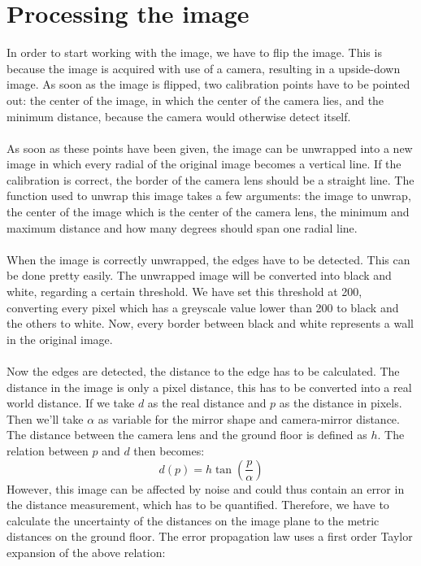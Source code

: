 \documentclass[12pt]{article}
\begin{document}
\section{Processing the image}
In order to start working with the image, we have to flip the image. This is because the image is acquired with use of a camera, resulting in a upside-down image. As soon as the image is flipped, two calibration points have to be pointed out: the center of the image, in which the center of the camera lies, and the minimum distance, because the camera would otherwise detect itself. \\ \\
As soon as these points have been given, the image can be unwrapped into a new image in which every radial of the original image becomes a vertical line. If the calibration is correct, the border of the camera lens should be a straight line. The function used to unwrap this image takes a few arguments: the image to unwrap, the center of the image which is the center of the camera lens, the minimum and maximum distance and how many degrees should span one radial line. \\ \\
When the image is correctly unwrapped, the edges have to be detected. This can be done pretty easily. The unwrapped image will be converted into black and white, regarding a certain threshold. We have set this threshold at 200, converting every pixel which has a greyscale value lower than 200 to black and the others to white. Now, every border between black and white represents a wall in the original image. \\ \\
Now the edges are detected, the distance to the edge has to be calculated. The distance in the image is only a pixel distance, this has to be converted into a real world distance. If we take $d$ as the real distance and $p$ as the distance in pixels. Then we'll take $\alpha$ as variable for the mirror shape and camera-mirror distance. The distance between the camera lens and the ground floor is defined as $h$. The relation between $p$ and $d$ then becomes:
\begin{equation}
	d(p) = h \tan{(\frac{p}{\alpha})}
\end{equation}
However, this image can be affected by noise and could thus contain an error in the distance measurement, which has to be quantified. Therefore, we have to calculate the uncertainty of the distances on the image plane to the metric distances on the ground floor. The error propagation law uses a first order Taylor expansion of the above relation:
\end{document}
